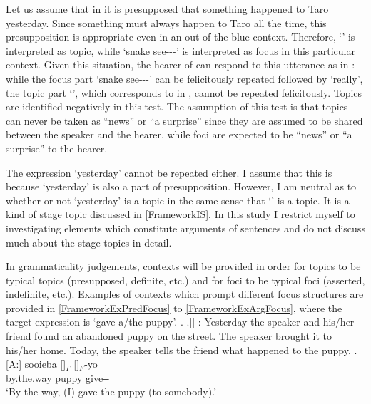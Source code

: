 Let us assume that in \Last[-Taro] it is presupposed that something happened to Taro yesterday.
Since something must always happen to Taro all the time,
this presupposition is appropriate even in an out-of-the-blue context.
Therefore,
 `' is interpreted as topic,
while  `snake see---' is interpreted as focus in this particular context.
Given this situation,
the hearer of \Last[-Taro] can respond to this utterance as in \Last[-Jiro]:
while the focus part  `snake see---' can be felicitously repeated followed by  `really',
the topic part  `',
which corresponds to  in \Last[-Jiro], cannot be repeated felicitously.
Topics are identified negatively in this test.
The assumption of this  test is that
topics can never be taken as ``news'' or ``a surprise'' since they are assumed to be shared between the speaker and the hearer,
while foci are expected to be ``news'' or ``a surprise'' to the hearer.

The expression  `yesterday' cannot be repeated either.
I assume that this is because  `yesterday' is also a part of presupposition.
However, I am neutral as to whether or not  `yesterday' is a topic
in the same sense that  `' is a topic.
It is a kind of stage topic discussed in \ref{FrameworkIS}.
In this study I restrict myself to investigating elements which constitute arguments of sentences
and do not discuss much about the stage topics in detail.

In grammaticality judgements,
contexts will be provided
in order for topics to be typical topics (presupposed, definite, etc.)
and for foci to be typical foci (asserted, indefinite, etc.).
Examples of contexts which prompt different focus structures are provided in \ref{FrameworkExPredFocus} to \ref{FrameworkExArgFocus},
where the target expression is  `gave a/the puppy'.
%
	\ex. \label{FrameworkExPredFocus}
	\a.[] : Yesterday the speaker and his/her friend found an abandoned puppy on the street. The speaker brought it to his/her home. Today, the speaker tells the friend what happened to the puppy.
	\bg.[A:] sooieba []$_{T}$ []$_{F}$-yo \\
		by.the.way puppy give-- \\
		`By the way, (I) gave the puppy (to somebody).'

